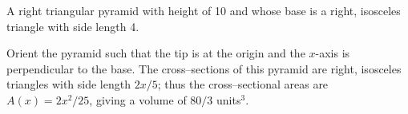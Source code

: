 {A right triangular pyramid with height of 10 and whose base is a right, isosceles triangle with side length 4.

}
{Orient the pyramid such that the tip is at the origin and the $x$-axis is perpendicular to the base. The cross--sections of this pyramid are right, isosceles triangles with side length $2x/5$; thus the cross--sectional areas are $A(x) = 2x^2/25$, giving a volume of $80/3$ units$^3$.
}

